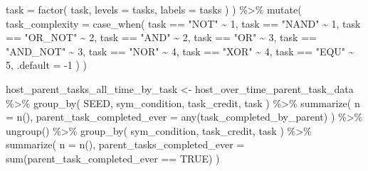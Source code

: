 \documentclass[
]{book}
\newenvironment{Shaded}{\begin{snugshade}}{\end{snugshade}}
\newcommand{\AttributeTok}[1]{\textcolor[rgb]{0.77,0.63,0.00}{#1}}
\newcommand{\ConstantTok}[1]{\textcolor[rgb]{0.00,0.00,0.00}{#1}}
\newcommand{\DecValTok}[1]{\textcolor[rgb]{0.00,0.00,0.81}{#1}}
\newcommand{\FunctionTok}[1]{\textcolor[rgb]{0.00,0.00,0.00}{#1}}
\newcommand{\NormalTok}[1]{#1}
\newcommand{\OtherTok}[1]{\textcolor[rgb]{0.56,0.35,0.01}{#1}}
\newcommand{\SpecialCharTok}[1]{\textcolor[rgb]{0.00,0.00,0.00}{#1}}
\newcommand{\StringTok}[1]{\textcolor[rgb]{0.31,0.60,0.02}{#1}}
\begin{document}
\begin{Shaded}
\begin{Highlighting}[]
    \AttributeTok{task =} \FunctionTok{factor}\NormalTok{(}
\NormalTok{      task,}
      \AttributeTok{levels =}\NormalTok{ tasks,}
      \AttributeTok{labels =}\NormalTok{ tasks}
\NormalTok{    )}
\NormalTok{  ) }\SpecialCharTok{\%\textgreater{}\%}
  \FunctionTok{mutate}\NormalTok{(}
    \AttributeTok{task\_complexity =} \FunctionTok{case\_when}\NormalTok{(}
\NormalTok{      task }\SpecialCharTok{==} \StringTok{"NOT"} \SpecialCharTok{\textasciitilde{}} \DecValTok{1}\NormalTok{,}
\NormalTok{      task }\SpecialCharTok{==} \StringTok{"NAND"} \SpecialCharTok{\textasciitilde{}} \DecValTok{1}\NormalTok{,}
\NormalTok{      task }\SpecialCharTok{==} \StringTok{"OR\_NOT"} \SpecialCharTok{\textasciitilde{}} \DecValTok{2}\NormalTok{,}
\NormalTok{      task }\SpecialCharTok{==} \StringTok{"AND"} \SpecialCharTok{\textasciitilde{}} \DecValTok{2}\NormalTok{,}
\NormalTok{      task }\SpecialCharTok{==} \StringTok{"OR"} \SpecialCharTok{\textasciitilde{}} \DecValTok{3}\NormalTok{,}
\NormalTok{      task }\SpecialCharTok{==} \StringTok{"AND\_NOT"} \SpecialCharTok{\textasciitilde{}} \DecValTok{3}\NormalTok{,}
\NormalTok{      task }\SpecialCharTok{==} \StringTok{"NOR"} \SpecialCharTok{\textasciitilde{}} \DecValTok{4}\NormalTok{,}
\NormalTok{      task }\SpecialCharTok{==} \StringTok{"XOR"} \SpecialCharTok{\textasciitilde{}} \DecValTok{4}\NormalTok{,}
\NormalTok{      task }\SpecialCharTok{==} \StringTok{"EQU"} \SpecialCharTok{\textasciitilde{}} \DecValTok{5}\NormalTok{,}
      \AttributeTok{.default =} \SpecialCharTok{{-}}\DecValTok{1}
\NormalTok{    )}
\NormalTok{  )}

\NormalTok{host\_parent\_tasks\_all\_time\_by\_task }\OtherTok{\textless{}{-}}\NormalTok{ host\_over\_time\_parent\_task\_data }\SpecialCharTok{\%\textgreater{}\%}
  \FunctionTok{group\_by}\NormalTok{(}
\NormalTok{    SEED,}
\NormalTok{    sym\_condition,}
\NormalTok{    task\_credit,}
\NormalTok{    task}
\NormalTok{  ) }\SpecialCharTok{\%\textgreater{}\%}
  \FunctionTok{summarize}\NormalTok{(}
    \AttributeTok{n =} \FunctionTok{n}\NormalTok{(),}
    \AttributeTok{parent\_task\_completed\_ever =} \FunctionTok{any}\NormalTok{(task\_completed\_by\_parent)}
\NormalTok{  ) }\SpecialCharTok{\%\textgreater{}\%}
  \FunctionTok{ungroup}\NormalTok{() }\SpecialCharTok{\%\textgreater{}\%}
  \FunctionTok{group\_by}\NormalTok{(}
\NormalTok{    sym\_condition,}
\NormalTok{    task\_credit,}
\NormalTok{    task}
\NormalTok{  ) }\SpecialCharTok{\%\textgreater{}\%}
  \FunctionTok{summarize}\NormalTok{(}
    \AttributeTok{n =} \FunctionTok{n}\NormalTok{(),}
    \AttributeTok{parent\_tasks\_completed\_ever =} \FunctionTok{sum}\NormalTok{(parent\_task\_completed\_ever }\SpecialCharTok{==} \ConstantTok{TRUE}\NormalTok{)}
\NormalTok{  )}
\end{Highlighting}
\end{Shaded}
\end{document}
